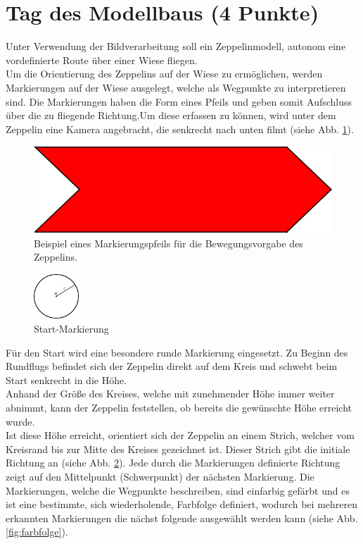 \documentclass{ezb}
\begin{document}
\section{Tag des Modellbaus (4 Punkte)}
Unter Verwendung der Bildverarbeitung soll ein Zeppelinmodell, autonom eine vordefinierte Route über einer Wiese fliegen.\\
\linebreak
Um die Orientierung des Zeppelins auf der Wiese zu ermöglichen, werden Markierungen auf der Wiese ausgelegt, welche als Wegpunkte zu interpretieren sind. Die Markierungen haben die Form eines Pfeils und geben somit Aufschluss über die zu fliegende Richtung.Um diese erfassen zu können, wird unter dem Zeppelin eine Kamera angebracht, die senkrecht nach unten filmt (siehe Abb. \ref{fig1}).\\ 
\begin{figure}[h]
	\centering
  \includegraphics[scale=0.7]{richtungspfeil.png}
	\caption{Beispiel eines Markierungspfeils für die Bewegungsvorgabe des Zeppelins.}
	\label{fig1}
\end{figure}
\linebreak
\begin{figure}
\includegraphics[width=0.15\textwidth]{regelkreis.png}
\caption{\label{fig:kreis}Start-Markierung}
\end{figure}
Für den Start wird eine besondere runde Markierung eingesetzt. Zu Beginn des Rundflugs befindet sich der Zeppelin direkt auf dem Kreis und schwebt beim Start senkrecht in die Höhe.\\ Anhand der Größe des Kreises, welche mit zunehmender Höhe immer weiter abnimmt, kann der Zeppelin feststellen, ob bereits die gewünschte Höhe erreicht wurde.\\
\linebreak
Ist diese Höhe erreicht, orientiert sich der Zeppelin an einem Strich, welcher vom Kreisrand bis zur Mitte des Kreises gezeichnet ist. Dieser Strich gibt die initiale Richtung an (siehe Abb. \ref{fig:kreis}). Jede durch die Markierungen definierte Richtung zeigt auf den Mittelpunkt (Schwerpunkt) der nächsten Markierung. Die Markierungen, welche die Wegpunkte beschreiben, sind einfarbig gefärbt und es ist eine bestimmte, sich wiederholende, Farbfolge definiert, wodurch bei mehreren erkannten Markierungen die nächst folgende ausgewählt werden kann (siehe Abb. \ref{fig:farbfolge}).\\
\end{document}
